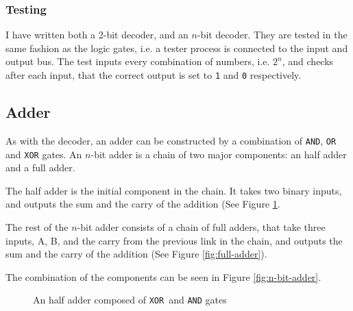 \subsubsection{Testing}
I have written both a 2-bit decoder, and an $n$-bit decoder. They are tested in
the same fashion as the logic gates, i.e. a tester process is connected to the
input and output bus. The test inputs every combination of numbers, i.e. $2^n$,
and checks after each input, that the correct output is set to \texttt{1} and
\texttt{0} respectively.

\subsection{Adder}
As with the decoder, an adder can be constructed by a combination of
\texttt{AND}, \texttt{OR} and \texttt{XOR} gates. An $n$-bit adder is a chain
of two major components: an half adder and a full adder.

The half adder is the initial component in the chain. It takes two binary
inputs, and outputs the sum and the carry of the addition (See Figure
\ref{fig:half-adder}.

The rest of the $n$-bit adder consists of a chain of full adders, that take
three inputs, A, B, and the carry from the previous link in the chain, and
outputs the sum and the carry of the addition (See Figure
\ref{fig:full-adder}).

The combination of the components can be seen in Figure \ref{fig:n-bit-adder}.


\begin{figure}
    \centering
    \caption{An half adder composed of \texttt{XOR} and \texttt{AND} gates}
    \label{fig:half-adder}
\end{figure}

